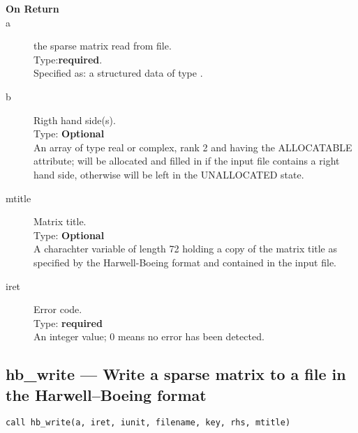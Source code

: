 \begin{description}
\item[\bf On Return]
\item[a] the sparse matrix read from file.\\
Type:{\bf required}.\\
Specified as: a structured data of type \spdata.
\item[b] Rigth hand side(s).\\
Type: {\bf Optional} \\
An  array of type real or complex, rank 2 and having the ALLOCATABLE
attribute; will be allocated and filled in if the input file contains
a right hand side, otherwise will be left in the UNALLOCATED state. 
\item[mtitle] Matrix title.\\
Type: {\bf Optional} \\
A charachter variable of length 72 holding a copy of the
matrix title as specified by the Harwell-Boeing format and contained
in the input file.
\item[iret] Error code.\\
Type: {\bf required} \\
An integer value; 0 means no error has been detected. 
\end{description}



\clearpage\subsection*{hb\_write --- Write a sparse matrix to a  file
  in the Harwell--Boeing format}


\begin{lstlisting}
call hb_write(a, iret, iunit, filename, key, rhs, mtitle)
\end{lstlisting}



